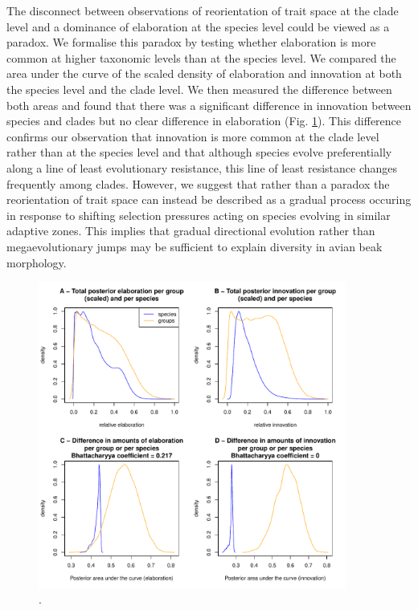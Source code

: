 \documentclass[12pt,letterpaper]{article}
\begin{document}
The disconnect between observations of reorientation of trait space at the clade level and a dominance of elaboration at the species level could be viewed as a paradox.
We formalise this paradox by testing whether elaboration is more common at higher taxonomic levels than at the species level.
We compared the area under the curve of the scaled density of elaboration and innovation at both the species level and the clade level.
We then measured the difference between both areas and found that there was a significant difference in innovation between species and clades but no clear difference in elaboration (Fig. \ref{Fig:relative_EI}).
This difference confirms our observation that innovation is more common at the clade level rather than at the species level and that although species evolve preferentially along a line of least evolutionary resistance, this line of least resistance changes frequently among clades.
However, we suggest that rather than a paradox the reorientation of trait space can instead be described as a gradual process occuring in response to shifting selection pressures acting on species evolving in similar adaptive zones.
This implies that gradual directional evolution \cite{pagel2022general} rather than megaevolutionary jumps \cite{cooney2017mega,venditti2011multiple} may be sufficient to explain diversity in avian beak morphology.

\begin{figure}[!htbp]
\centering
   \includegraphics[width=0.9\textwidth]{Figures/relative_EI.pdf}
\caption{.}
\label{Fig:relative_EI}
\end{figure}
\end{document}
